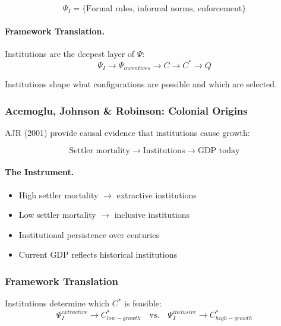 \begin{equation}
\boxed{
\Psi_I = \{\text{Formal rules, informal norms, enforcement}\}
}
\label{eq:north-institutions}
\end{equation}

\paragraph{Framework Translation.}
Institutions are the deepest layer of $\Psi$:
\begin{equation}
\Psi_I \to \Psi_{incentives} \to C \to C^* \to Q
\end{equation}

Institutions shape what configurations are possible and which are selected.

\subsubsection{Acemoglu, Johnson \& Robinson: Colonial Origins}

AJR (2001) provide causal evidence that institutions cause growth:

\begin{equation}
\boxed{
\text{Settler mortality} \to \text{Institutions} \to \text{GDP today}
}
\label{eq:ajr}
\end{equation}

\paragraph{The Instrument.}
\begin{itemize}
    \item High settler mortality $\to$ extractive institutions
    \item Low settler mortality $\to$ inclusive institutions
    \item Institutional persistence over centuries
    \item Current GDP reflects historical institutions
\end{itemize}

\subsubsection{Framework Translation}

Institutions determine which $C^*$ is feasible:
\begin{equation}
\Psi_I^{extractive} \to C^*_{low-growth} \quad \text{vs.} \quad 
\Psi_I^{inclusive} \to C^*_{high-growth}
\end{equation}

